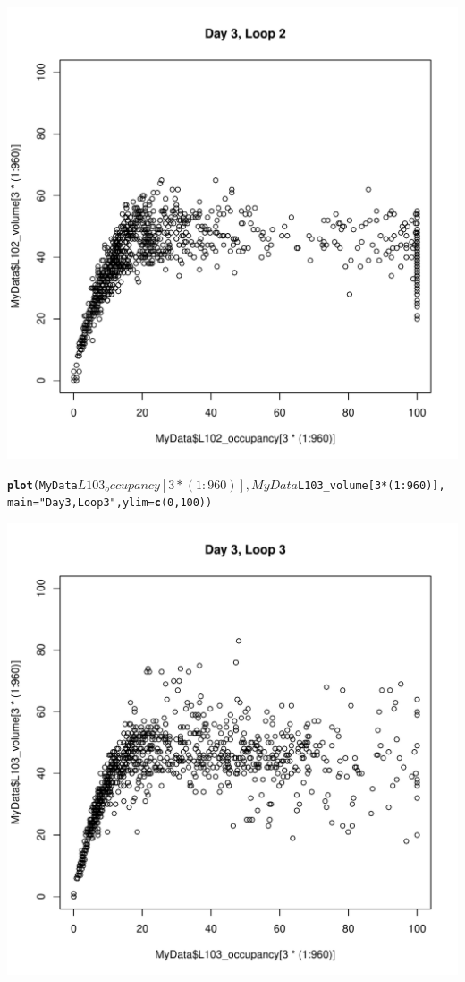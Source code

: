 \documentclass[review, authoryear]{elsarticle}\usepackage{graphicx, color}
\makeatletter
\def\maxwidth{ %
  \ifdim\Gin@nat@width>\linewidth
    \linewidth
  \else
    \Gin@nat@width
  \fi
}
\newcommand{\hlfunctioncall}[1]{\textcolor[rgb]{0.501960784313725,0,0.329411764705882}{\textbf{#1}}}%
\newcommand{\hlstring}[1]{\textcolor[rgb]{0.6,0.6,1}{#1}}%
\newenvironment{kframe}{%
 \def\at@end@of@kframe{}%
 \ifinner\ifhmode%
  \def\at@end@of@kframe{\end{minipage}}%
  \begin{minipage}{\columnwidth}%
 \fi\fi%
 \def\FrameCommand##1{\hskip\@totalleftmargin \hskip-\fboxsep
 \colorbox{shadecolor}{##1}\hskip-\fboxsep
     \hskip-\linewidth \hskip-\@totalleftmargin \hskip\columnwidth}%
 \MakeFramed {\advance\hsize-\width
   \@totalleftmargin\z@ \linewidth\hsize
   \@setminipage}}%
 {\par\unskip\endMakeFramed%
 \at@end@of@kframe}
\newenvironment{knitrout}{}{} %
\makeatother
\begin{document}
\begin{knitrout}
\begin{kframe}
\end{kframe}\includegraphics[width=\maxwidth]{figure/unnamed-chunk-12} \begin{kframe}\begin{alltt}
\hlfunctioncall{plot}(MyData$L103_occupancy[3 * (1:960)], MyData$L103_volume[3 * (1:960)], 
    main = \hlstring{"Day 3, Loop 3"}, ylim = \hlfunctioncall{c}(0, 100))
\end{alltt}
\end{kframe}\includegraphics[width=\maxwidth]{figure/unnamed-chunk-13} \begin{kframe}\begin{alltt}

\end{alltt}
\end{kframe}
\end{knitrout}
\end{document}
